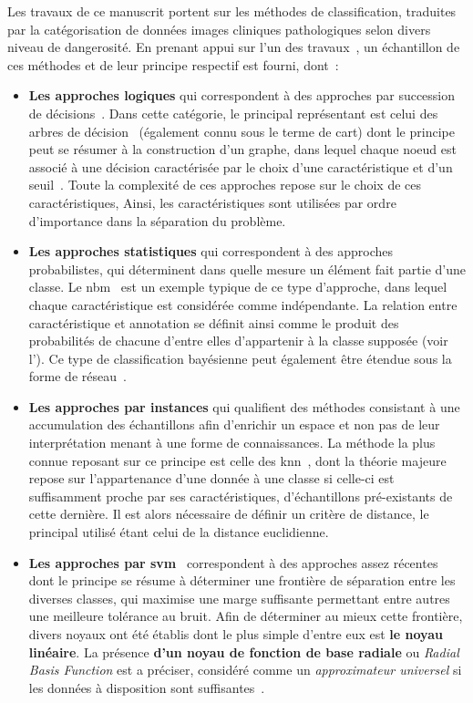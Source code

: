 Les travaux de ce manuscrit portent sur les méthodes de classification, traduites par la catégorisation de données images cliniques pathologiques selon divers niveau de dangerosité. En prenant appui sur l'un des travaux~\cite{Kotsiantis2007}, un échantillon de ces méthodes et de leur principe respectif est fourni, dont~:
\begin{itemize}
    \item \textbf{Les approches logiques} qui correspondent à des approches par succession de décisions~\cite{Kotsiantis2007}. Dans cette catégorie, le principal représentant est celui des arbres de décision~\cite{Breiman1984} (également connu sous le terme de \gls{cart}) dont le principe peut se résumer à la construction d'un graphe, dans lequel chaque noeud est associé à une décision caractérisée par le choix d'une caractéristique et d'un seuil~\cite{Quinlan1986}. Toute la complexité de ces approches repose sur le choix de ces caractéristiques, Ainsi, les caractéristiques sont utilisées par ordre d'importance dans la séparation du problème.
    \item \textbf{Les approches statistiques} qui correspondent à des approches probabilistes, qui déterminent dans quelle mesure un élément fait partie d'une classe. Le \gls{nbm}~\cite{Zhang2004} est un exemple typique de ce type d'approche, dans lequel chaque caractéristique est considérée comme indépendante. La relation entre caractéristique et annotation se définit ainsi comme le produit des probabilités de chacune d'entre elles d'appartenir à la classe supposée (voir l'). Ce type de classification bayésienne peut également être étendue sous la forme de réseau~\cite{Kononenko1989}.
    \item \textbf{Les approches par instances} qui qualifient des méthodes consistant à une accumulation des échantillons afin d'enrichir un espace et non pas de leur interprétation menant à une forme de connaissances. La méthode la plus connue reposant sur ce principe est celle des \gls{knn}~\cite{Cover1967}, dont la théorie majeure repose sur l'appartenance d'une donnée à une classe si celle-ci est suffisamment proche par ses caractéristiques, d'échantillons pré-existants de cette dernière. Il est alors nécessaire de définir un critère de distance, le principal utilisé étant celui de la distance euclidienne. 
    \item \textbf{Les approches par \gls{svm}}~\cite{Cortes1995} correspondent à des approches assez récentes dont le principe se résume à déterminer une frontière de séparation entre les diverses classes, qui maximise une marge suffisante permettant entre autres une meilleure tolérance au bruit. Afin de déterminer au mieux cette frontière, divers noyaux ont été établis dont le plus simple d'entre eux est \textbf{le noyau linéaire}. La présence \textbf{d'un noyau de fonction de base radiale} ou \textit{Radial Basis Function} est a préciser, considéré comme un \textit{approximateur universel} si les données à disposition sont suffisantes~\cite{Wang2004}.

\end{itemize}
